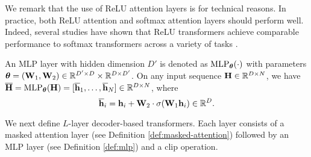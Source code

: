 We remark that the use of ReLU attention layers is for technical reasons. In practice, both ReLU attention and softmax attention layers should perform well. Indeed, several studies have shown that ReLU transformers achieve comparable performance to softmax transformers  across a variety of tasks \citep{wortsman2023replacing, shen2023study, bai2023transformers}.

\begin{definition}
\label{def:mlp}
An MLP layer with hidden dimension $D'$ is denoted as $\mathrm{MLP}_{{\boldsymbol \theta}}(\cdot)$ with parameters ${\boldsymbol \theta}=({\mathbf W}_1,{\mathbf W}_2)\in\mathbb{R}^{D'\times D}\times\mathbb{R}^{D\times D'}$. On any input sequence ${\mathbf H}\in\mathbb{R}^{D\times N}$, we have $\overline{{\mathbf H}} = \mathrm{MLP}_{{\boldsymbol \theta}}({\mathbf H}) = [\overline{{\mathbf h}}_1, \ldots, \overline{{\mathbf h}}_N] \in \mathbb{R}^{D \times N}$, where
\[
\overline{{\mathbf h}}_i={\mathbf h}_i+{\mathbf W}_2 \cdot \sigma({\mathbf W}_1{\mathbf h}_i) \in \mathbb{R}^D.
\]
\end{definition}
We next define $L$-layer decoder-based transformers. Each layer consists of a masked attention layer (see Definition \ref{def:masked-attention}) followed by an MLP layer (see Definition \ref{def:mlp}) and a clip operation. 




